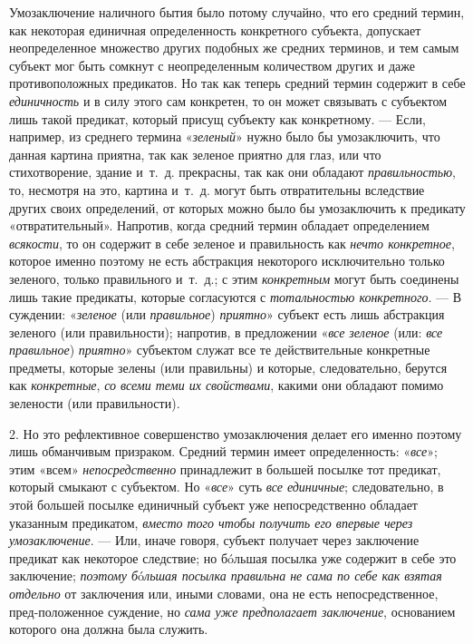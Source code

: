 \documentclass[twoside]{article}
\begin{document}
{{{{{Умозаключение наличного бытия было потому случайно, что его
средний термин, как некоторая единичная определенность конкретного
субъекта, допускает неопределенное множество других подобных же средних
терминов, и тем самым субъект мог быть сомкнут с неопределенным количеством
других и даже противоположных предикатов. Но так как теперь средний термин
содержит в себе {\em единичность}
и в силу этого сам конкретен, то он может связывать с
субъектом лишь такой предикат, который присущ субъекту как конкретному. —
Если, например, из среднего термина
«{\em зеленый}» нужно
было бы умозаключить, что данная картина приятна, так как зеленое приятно
для глаз, или что стихотворение, здание и~т.~д. прекрасны, так как они
обладают {\em правильностью},
то, несмотря на это, картина и~т.~д. могут быть отвратительны
вследствие других своих определений, от которых можно было бы умозаключить
к предикату «отвратительный». Напротив, когда средний термин обладает
определением {\em всякости},
то он содержит в себе зеленое и правильность как
{\em нечто конкретное},
которое именно поэтому не есть абстракция некоторого
исключительно только зеленого, только правильного и~т.~д.; с этим
{\em конкретным} могут
быть соединены лишь такие предикаты, которые согласуются с
{\em тотальностью конкретного}. —
В суждении:
«{\em зеленое} (или
{\em правильное})
{\em приятно}» субъект
есть лишь абстракция зеленого (или правильности); напротив, в предложении
«{\em все зеленое} (или:
{\em все правильное})
{\em приятно}» субъектом
служат все те действительные конкретные предметы, которые зелены (или
правильны) и которые, следовательно, берутся как
{\em конкретные},
{\em со всеми теми их свойствами},
какими они обладают помимо зелености (или правильности).

2. Но это рефлективное совершенство умозаключения делает его
именно поэтому лишь обманчивым призраком. Средний термин имеет
определенность: «{\em все}»;
этим «всем»
{\em непосредственно}
принадлежит в большей посылке тот предикат, который смыкают с
субъектом. Но «{\em все}»
суть {\em все единичные};
следовательно, в этой большей посылке единичный субъект уже
непосредственно обладает указанным предикатом,
{\em вместо того чтобы получить его
впервые через умозаключение}. — Или, иначе говоря, субъект
получает через заключение предикат как некоторое следствие; но бóльшая
посылка уже содержит в себе это заключение;
{\em поэтому
б}ó{\em льшая посылка правильна не сама
по себе как взятая отдельно} от заключения или, иными
словами, она не есть непосредственное, пред-положенное суждение, но
{\em сама уже предполагает заключение},
основанием которого она должна была служить.

}}}}}
\end{document}
